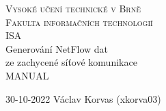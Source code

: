 \documentclass[12pt]{article}
\begin{document}
\begin{titlepage}
\begin{center}

\Huge\textsc{Vysoké učení technické v Brně\\
\huge
Fakulta informačních technologií}\\
\LARGE ISA\\ 
\Huge Generování NetFlow dat\\ ze zachycené síťové komunikace\\
\Large MANUAL

\end{center}
\Large
30-10-2022 \hfill Václav Korvas (xkorva03)
\end{titlepage}

\tableofcontents
\newpage
\end{document}

